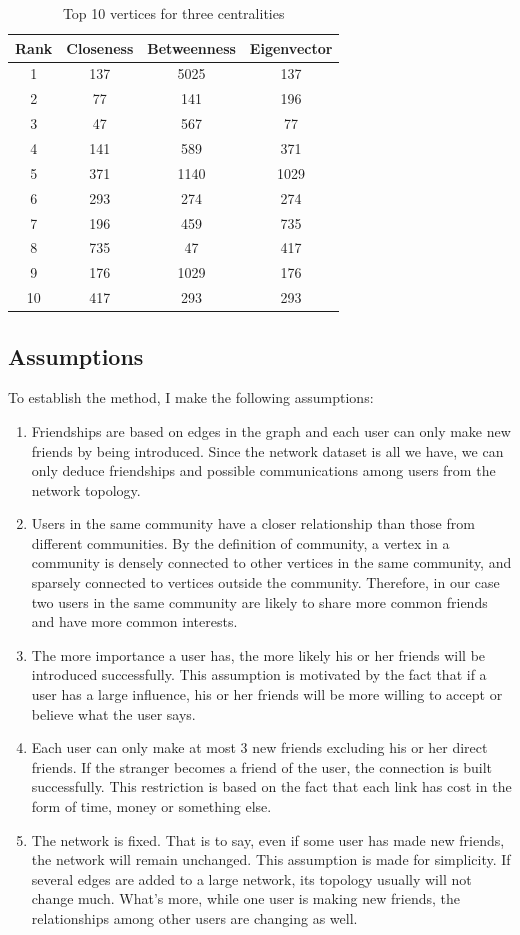 \documentclass[journal]{IEEEtran}
\begin{document}
\begin{table}[h]
\renewcommand{\arraystretch}{1.3}
\centering
\caption{Top 10 vertices for three centralities}
\label{tab:1}
\begin{tabular}{| c |  c | c | c |}
\hline
Rank & Closeness & Betweenness & Eigenvector \\
\hline
1 & 137 & 5025 & 137\\
2 & 77 & 141 & 196\\
3 & 47 & 567 & 77\\
4 & 141 & 589 & 371\\   
5 & 371 & 1140 & 1029\\    
6 & 293 & 274 & 274\\      
7 & 196 & 459 & 735\\     
8 & 735 & 47 & 417\\
9 & 176 & 1029 & 176\\
10 & 417 & 293 & 293\\
\hline
\end {tabular}
\end{table}

\subsection{Assumptions}
To establish the method, I make the following assumptions: 

\begin{enumerate}
\item\label{enu:1}
Friendships are based on edges in the graph and each user can only make new friends by being introduced. Since the network dataset is all we have, we can only deduce friendships and possible communications among users from the network topology. 
\item\label{enu:2}
Users in the same community have a closer relationship than those from different communities. By the definition of community, a vertex in a community is densely connected to other vertices in the same community, and sparsely connected to vertices outside the community. Therefore, in our case two users in the same community are likely to share more common friends and have more common interests.
\item\label{enu:3}
The more importance a user has, the more likely his or her friends will be introduced successfully. This assumption is motivated by the fact that if a user has a large influence, his or her friends will be more willing to accept or believe what the user says.
\item\label{enu:4}
Each user can only make at most 3 new friends excluding his or her direct friends. If the stranger becomes a friend of the user, the connection is built successfully. This restriction is based on the fact that each link has cost in the form of time, money or something else. 
\item
The network is fixed. That is to say, even if some user has made new friends, the network will remain unchanged. This assumption is made for simplicity. If several edges are added to a large network, its topology usually will not change much. What's more, while one user is making new friends, the relationships among other users are changing as well.
\end{enumerate}
\end{document}

